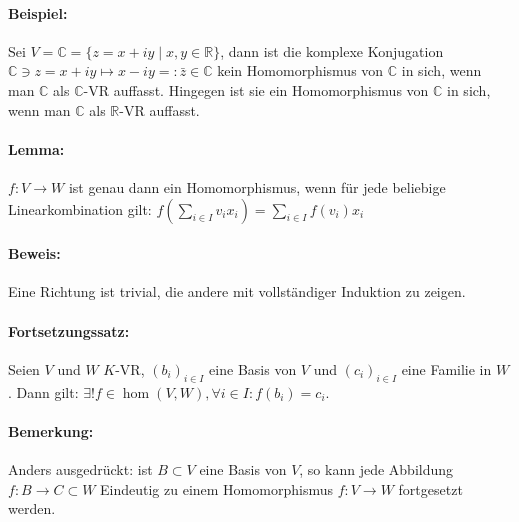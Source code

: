 \paragraph{Beispiel:}
	Sei $V = \mathbb{C} = \{z = x+iy\mid x,y\in \mathbb{R}\}$, dann ist die komplexe Konjugation $\mathbb{C}\ni z = x+iy \mapsto x-iy =: \bar{z} \in \mathbb{C}$ kein Homomorphismus von $\mathbb{C}$ in sich, wenn man $\mathbb{C}$ als $\mathbb{C}$-VR auffasst. Hingegen ist sie ein Homomorphismus von $\mathbb{C}$ in sich, wenn man $\mathbb{C}$ als $ \mathbb{R} $-VR auffasst.
\paragraph{Lemma:}
	$f:V\to W$ ist genau dann ein Homomorphismus, wenn für jede beliebige Linearkombination gilt: $f(\sum_{i\in I}v_ix_i) = \sum_{i\in I}f(v_i)x_i$

\paragraph{Beweis:}
	Eine Richtung ist trivial, die andere mit vollständiger Induktion zu zeigen.
\paragraph{Fortsetzungssatz:} 
	Seien $ V $ und $ W $ $K$-VR, $(b_i)_{i\in I}$ eine Basis von $ V $ und $(c_i)_{i\in I}$ eine Familie in $ W $. Dann gilt: $\exists!f\in \hom(V,W), \forall i\in I: f(b_i) = c_i$.
    
\paragraph{Bemerkung:}
    Anders ausgedrückt: ist $B\subset V$ eine Basis von $ V $, so kann jede Abbildung $f: B\to C\subset W$ Eindeutig zu einem Homomorphismus $f: V\to W$ fortgesetzt werden.
    
